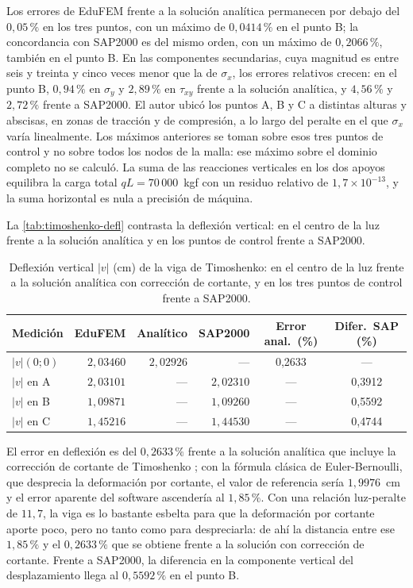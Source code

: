 Los errores de EduFEM frente a la solución analítica permanecen por debajo del $0{,}05\,\%$ en los tres puntos, con un máximo de $0{,}0414\,\%$ en el punto B; la concordancia con SAP2000 es del mismo orden, con un máximo de $0{,}2066\,\%$, también en el punto B. En las componentes secundarias, cuya magnitud es entre seis y treinta y cinco veces menor que la de $\sigma_x$, los errores relativos crecen: en el punto B, $0{,}94\,\%$ en $\sigma_y$ y $2{,}89\,\%$ en $\tau_{xy}$ frente a la solución analítica, y $4{,}56\,\%$ y $2{,}72\,\%$ frente a SAP2000. El autor ubicó los puntos A, B y C a distintas alturas y abscisas, en zonas de tracción y de compresión, a lo largo del peralte en el que $\sigma_x$ varía linealmente. Los máximos anteriores se toman sobre esos tres puntos de control y no sobre todos los nodos de la malla: ese máximo sobre el dominio completo no se calculó. La suma de las reacciones verticales en los dos apoyos equilibra la carga total $qL = 70\,000$~kgf con un residuo relativo de $1{,}7\times10^{-13}$, y la suma horizontal es nula a precisión de máquina.

La \autoref{tab:timoshenko-defl} contrasta la deflexión vertical: en el centro de la luz frente a la solución analítica y en los puntos de control frente a SAP2000.

\begin{table}[htbp]
\centering
\caption[Deflexión vertical $|v|$ (cm): EduFEM frente a la solución analítica y a SAP2000.]{Deflexión vertical $|v|$ (cm) de la viga de Timoshenko: en el centro de la luz frente a la solución analítica con corrección de cortante, y en los tres puntos de control frente a SAP2000.}
\label{tab:timoshenko-defl}
\begin{tabular}{l r r r c c}
\hline
Medición & EduFEM & Analítico & SAP2000 & Error anal.\ (\%) & Difer.\ SAP (\%) \\
\hline
$|v|(0;0)$ & $2{,}03460$ & $2{,}02926$ & ---         & 0,2633 & --- \\
$|v|$ en A & $2{,}03101$ & ---         & $2{,}02310$ & ---    & 0,3912 \\
$|v|$ en B & $1{,}09871$ & ---         & $1{,}09260$ & ---    & 0,5592 \\
$|v|$ en C & $1{,}45216$ & ---         & $1{,}44530$ & ---    & 0,4744 \\
\hline
\end{tabular}
\end{table}

El error en deflexión es del $0{,}2633\,\%$ frente a la solución analítica que incluye la corrección de cortante de Timoshenko \autocite[art.~21, pp.~39-43]{timoshenko1970elasticity}; con la fórmula clásica de Euler-Bernoulli, que desprecia la deformación por cortante, el valor de referencia sería $1{,}9976$~cm y el error aparente del software ascendería al $1{,}85\,\%$. Con una relación luz-peralte de $11{,}7$, la viga es lo bastante esbelta para que la deformación por cortante aporte poco, pero no tanto como para despreciarla: de ahí la distancia entre ese $1{,}85\,\%$ y el $0{,}2633\,\%$ que se obtiene frente a la solución con corrección de cortante. Frente a SAP2000, la diferencia en la componente vertical del desplazamiento llega al $0{,}5592\,\%$ en el punto B.

